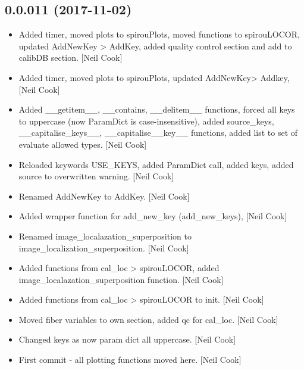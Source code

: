 \documentclass[a4paper,10pt,english]{report}
\begin{document}
\subsection{0.0.011 (2017-11-02)}
\label{\detokenize{misc/changelog:id538}}\begin{itemize}
\item {} 
Added timer, moved plots to spirouPlots, moved functions to
spirouLOCOR, updated AddNewKey \textendash{}\textgreater{} AddKey, added quality control
section and add to calibDB section. {[}Neil Cook{]}

\item {} 
Added timer, moved plots to spirouPlots, updated AddNewKey\textendash{}\textgreater{} Addkey,
{[}Neil Cook{]}

\item {} 
Added \_\_getitem\_\_, \_\_contains, \_\_delitem\_\_ functions, forced all keys
to uppercase (now ParamDict is case-insensitive), added source\_keys,
\_\_capitalise\_keys\_\_, \_\_capitalise\_\_key\_\_ functions, added list to set
of evaluate allowed types. {[}Neil Cook{]}

\item {} 
Reloaded keywords USE\_KEYS, added ParamDict call, added  keys,
added source to overwritten warning. {[}Neil Cook{]}

\item {} 
Renamed AddNewKey to AddKey. {[}Neil Cook{]}

\item {} 
Added wrapper function for add\_new\_key (add\_new\_keys), {[}Neil Cook{]}

\item {} 
Renamed image\_localazation\_superposition to
image\_localization\_superposition. {[}Neil Cook{]}

\item {} 
Added functions from cal\_loc \textendash{}\textgreater{} spirouLOCOR, added
image\_localazation\_superposition function. {[}Neil Cook{]}

\item {} 
Added functions from cal\_loc \textendash{}\textgreater{} spirouLOCOR to init. {[}Neil Cook{]}

\item {} 
Moved fiber variables to own section, added qc for cal\_loc. {[}Neil
Cook{]}

\item {} 
Changed keys as now param dict all uppercase. {[}Neil Cook{]}

\item {} 
First commit - all plotting functions moved here. {[}Neil Cook{]}

\end{itemize}
\end{document}
